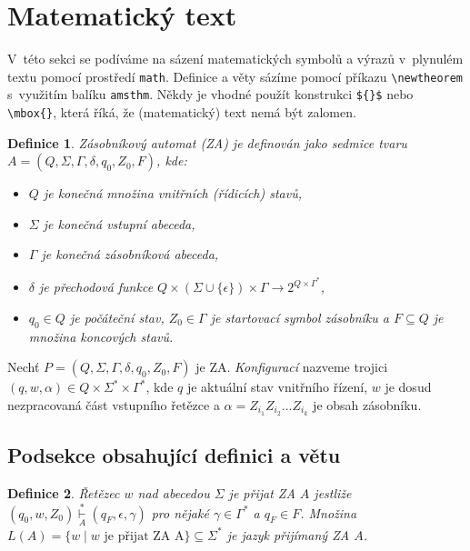 \documentclass[twocolumn,a4paper,11pt]{article}
\newtheorem{defi}{Definice}
\begin{document}
\section{Matematický text}
\label{sec:mattext}
V~této sekci se podíváme na sázení matematických symbolů a výrazů v~plynulém textu pomocí prostředí \verb|math|.
Definice a věty sázíme pomocí příkazu \verb|\newtheorem| s~využitím balíku \verb|amsthm|.
Někdy je vhodné použít konstrukci \verb|${}$| nebo \verb|\mbox{}|, která říká, že (matematický) text nemá být zalomen.
\begin{defi}
\label{def:ZA}
\textup{Zásobníkový automat} (ZA) je definován jako sedmice tvaru $A = (Q, \Sigma, \Gamma, \delta, q_0 , Z_0 , F)$, kde:
\begin{itemize}
    \item $Q$ je konečná množina \textup{vnitřních (řídicích) stavů},
    \item $\Sigma$ je konečná \textup{vstupní abeceda},
    \item $\Gamma$ je konečná \textup{zásobníková abeceda},
    \item $\delta$ je \textup{přechodová funkce} $Q \times (\Sigma \cup \{\epsilon\}) \times \Gamma \rightarrow 2^{Q \times \Gamma^*}$,
    \item $q_0 \in Q$ je \textup{počáteční stav,} $Z_0 \in \Gamma$ je \textup{startovací symbol zásobníku} a $F \subseteq Q$ je množina \textup{koncových stavů}.
\end{itemize}
\end{defi}
\par Nechť $P = (Q,\Sigma,\Gamma,\delta,q_0,Z_0,F)$ je ZA. \emph{Konfigurací} nazveme trojici $(q,w,\alpha) \in Q \times \Sigma^*\times \Gamma^*$, kde $q$ je aktuální stav vnitřního řízení, $w$ je dosud nezpracovaná část vstupního řetězce a $\alpha = Z_{i_1}Z_{i_2}\dots Z_{i_k}$ je obsah zásobníku.

\subsection{Podsekce obsahující definici a větu}
\begin{defi}
    \label{def:retezec}
    \textup{Řetězec $w$ nad abecedou $\Sigma$ je přijat ZA} $A$ jest\-li\-že $(q_0,w,Z_0) \underset{A}{\overset{*}{\vdash}} (q_F,\epsilon,\gamma)$ pro nějaké $\gamma \in \Gamma^*$ a $q_F \in F$. Množina $L(A) = \{w \mid w \text{ je přijat ZA A}\} \subseteq \Sigma^*$ je \textup{jazyk přijímaný ZA} $A$.
\end{defi}
\end{document}

